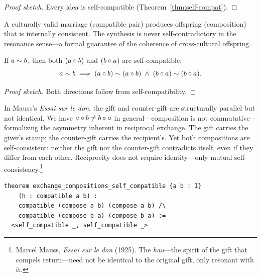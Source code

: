 \begin{proof}[Proof sketch]
Every idea is self-compatible (Theorem~\ref{thm:self-compat}).
\end{proof}

A culturally valid marriage (compatible pair) produces offspring (composition)
that is internally consistent.  The synthesis is never self-contradictory
in the resonance sense---a formal guarantee of the coherence of
cross-cultural offspring.

\begin{theorem}
\label{thm:exchange-symm}
If $a \sim b$, then both $(a \circ b)$ and $(b \circ a)$ are
self-compatible:
\[
  a \sim b
  \;\Longrightarrow\;
  (a \circ b) \sim (a \circ b)
  \;\wedge\;
  (b \circ a) \sim (b \circ a).
\]
\end{theorem}

\begin{proof}[Proof sketch]
Both directions follow from self-compatibility.
\end{proof}

In Mauss's \textit{Essai sur le don}, the gift and counter-gift are
structurally parallel but not identical.  We have $a \circ b \ne b \circ a$
in general---composition is not commutative---formalizing the asymmetry inherent
in reciprocal exchange.  The gift carries the giver's stamp; the counter-gift
carries the recipient's.  Yet both compositions are self-consistent: neither the
gift nor the counter-gift contradicts itself, even if they differ from each
other.  Reciprocity does not require identity---only mutual
self-consistency.\footnote{Marcel Mauss, \textit{Essai sur le don} (1925).
The \emph{hau}---the spirit of the gift that compels return---need not be
identical to the original gift, only resonant with it.}

\begin{lstlisting}[caption={Exchange symmetry in Lean~4}]
theorem exchange_compositions_self_compatible {a b : I}
    (h : compatible a b) :
    compatible (compose a b) (compose a b) /\
    compatible (compose b a) (compose b a) :=
  <self_compatible _, self_compatible _>
\end{lstlisting}


